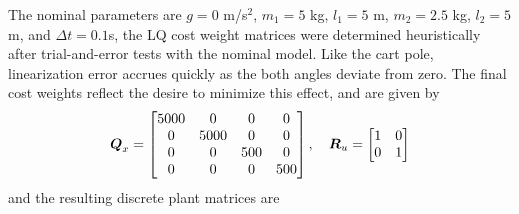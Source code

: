 The nominal parameters are $g = 0$ m/s$^{2}$, $m_{1} = 5$ kg, $l_{1} = 5$ m, $m_{2} = 2.5$ kg, $l_{2} = 5$ m, and $\Delta t = 0.1$s, the LQ cost weight matrices were determined heuristically after trial-and-error tests with the nominal model.  Like the cart pole, linearization error accrues quickly as the both angles deviate from zero.  The final cost weights reflect the desire to minimize this effect, and are given by
\begin{equation*}
\begin{aligned}
    \vb*{Q}_{x} = \begin{bmatrix}
        5000 & 0 & 0 & 0\\
        0 & 5000 & 0 & 0\\
        0 & 0 & 500 & 0\\
        0 & 0 & 0 & 500\\
    \end{bmatrix}, \hspace{10pt}
    \vb*{R}_{u} = \begin{bmatrix}
        1 & 0\\
        0 & 1\\
    \end{bmatrix}
\end{aligned}
\end{equation*}
and the resulting discrete plant matrices are
